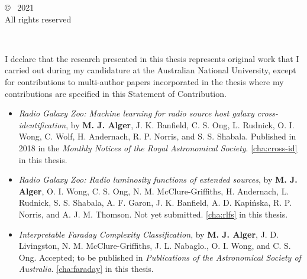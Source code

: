 \vspace*{14cm}
\begin{center}
  \makeatletter
  \copyright\ \@author{} 2021\\All rights reserved
  \makeatother
\end{center}
\noindent
\begin{center}
  \footnotesize{~} %
\end{center}
\noindent

\newpage






\vspace*{4cm}
    I declare that the research presented in this thesis represents original
    work that I carried out during my candidature at the Australian National
    University, except for contributions to multi-author papers incorporated
    in the thesis where my contributions are specified in this Statement of
    Contribution.

    \begin{itemize}
      \item \emph{Radio Galaxy Zoo: Machine learning for radio source host galaxy cross-identification}, by \textbf{M. J. Alger}, J. K. Banfield, C. S. Ong, L. Rudnick, O. I. Wong, C. Wolf, H. Andernach, R. P. Norris, and S. S. Shabala. Published in 2018 in the \emph{Monthly Notices of the Royal Astronomical Society}. \autoref{cha:cross-id} in this thesis.
      \item \emph{Radio Galaxy Zoo: Radio luminosity functions of extended sources}, by \textbf{M. J. Alger}, O. I. Wong, C. S. Ong, N. M. McClure-Griffiths, H. Andernach, L. Rudnick, S. S. Shabala, A. F. Garon, J. K. Banfield, A. D. Kapi\'nska, R. P. Norris, and A. J. M. Thomson. Not yet submitted. \autoref{cha:rlfs} in this thesis.
      \item \emph{Interpretable Faraday Complexity Classification}, by \textbf{M. J. Alger}, J. D. Livingston, N. M. McClure-Griffiths, J. L. Nabaglo., O. I. Wong, and C. S. Ong. Accepted; to be published in \emph{Publications of the Astronomical Society of Australia}. \autoref{cha:faraday} in this thesis.
    \end{itemize}

